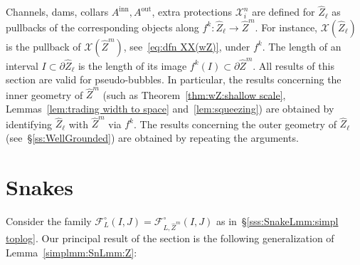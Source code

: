 \documentclass{amsart}
\newcommand{\1}{{\mathbb 1 }}
\newcommand{\Fam}{{\mathcal F}}
\newcommand\XX{\mathcal{X}}
\newcommand{\wZ}{{\widehat Z}}
\newcommand\inn{{\operatorname{inn}}}
\newcommand\out{{\operatorname{out}}}
\theoremstyle{remark}
\numberwithin{equation}{section}
\theoremstyle{definition}
\begin{document}
Channels, dams, collars $A^\inn, A^\out$, extra protections $\XX^n_i$ are defined for $\wZ_\ell$ as pullbacks of the corresponding objects along $f^k\colon \wZ_\ell\to  \wZ^m$. For instance, $\XX(\wZ_\ell)$ is the pullback of $\XX(\wZ^m)$, see~\eqref{eq:dfn XX(wZ)}, under $f^k$. The length of an interval $I\subset \partial \wZ_\ell$ is the length of its image $f^k(I)\subset \partial \wZ^m$. All results of this section are valid for pseudo-bubbles. In particular, the results concerning the inner geometry of $\wZ^m$ (such as Theorem~\ref{thm:wZ:shallow scale}, Lemmas~\ref{lem:trading  width to space} and~\ref{lem:squeezing}) are obtained by identifying $\wZ_\ell$ with $\wZ^m$ via $f^k$. The results concerning the outer geometry of $\wZ_\ell$ (see~\S\ref{ss:WellGrounded}) are obtained by repeating the arguments.





\section{Snakes}\label{s:snakes} Consider the family $\Fam^\circ _L(I,J)=\Fam^\circ_{L,\wZ^m}(I,J)$ as in~\S\ref{sss:SnakeLmm:simpl toplog}. Our principal result of the section is the following generalization of Lemma~\ref{simplmm:SnLmm:Z}:
\end{document}
